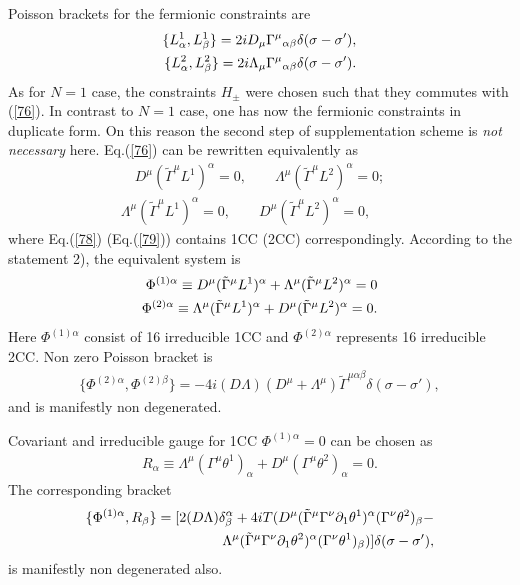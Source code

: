\documentclass[a4paper]{article}
\begin{document}
Poisson brackets for the fermionic constraints are 
\begin{eqnarray}\label{77}
\{L^1_\alpha, L^1_\beta\}=2iD_\mu{\Gamma^\mu}_{\alpha\beta}
\delta(\sigma-\sigma '), \cr 
\{L^2_\alpha,L^2_\beta\}=2i\Lambda_\mu{\Gamma^\mu}_{\alpha\beta}
\delta(\sigma-\sigma ').
\end{eqnarray}
As for $N=1$ case, the constraints $H_{\pm}$ were chosen such 
that they commutes with (\ref{76}). In contrast to $N=1$ case, one 
has now the fermionic constraints in duplicate form. On this reason 
the second step of supplementation scheme is {\em{not necessary}} 
here. Eq.(\ref{76}) can be rewritten equivalently as 
\begin{eqnarray}\label{78}
D^\mu(\tilde\Gamma^\mu L^1)^\alpha=0, \qquad 
\Lambda^\mu(\tilde\Gamma^\mu L^2)^\alpha=0;
\end{eqnarray}
\begin{eqnarray}\label{79}
\Lambda^\mu(\tilde\Gamma^\mu L^1)^\alpha=0, \qquad
D^\mu(\tilde\Gamma^\mu L^2)^\alpha=0, \qquad
\end{eqnarray}
where Eq.(\ref{78}) (Eq.(\ref{79})) contains 1CC (2CC) correspondingly. 
According to the statement 2), the equivalent system is 
\begin{eqnarray}\label{80}
\Phi^{(1)\alpha}\equiv
D^\mu(\tilde\Gamma^\mu L^1)^\alpha+
\Lambda^\mu(\tilde\Gamma^\mu L^2)^\alpha=0 \cr 
\Phi^{(2)\alpha}\equiv
\Lambda^\mu(\tilde\Gamma^\mu L^1)^\alpha+
D^\mu(\tilde\Gamma^\mu L^2)^\alpha=0.
\end{eqnarray}
Here $\Phi^{(1)\alpha}$ consist of 16 irreducible 1CC and 
$\Phi^{(2)\alpha}$ represents 16 irreducible 2CC. Non zero Poisson 
bracket is 
\begin{eqnarray}\label{81}
\{\Phi^{(2)\alpha}, \Phi^{(2)\beta}\}=-4i(D\Lambda)
(D^\mu+\Lambda^\mu)\tilde\Gamma^{\mu\alpha\beta}
\delta(\sigma-\sigma '),
\end{eqnarray}
and is manifestly non degenerated. 

Covariant and irreducible gauge for 1CC $\Phi^{(1)\alpha}=0$ 
can be chosen as 
\begin{eqnarray}\label{82}
R_\alpha\equiv\Lambda^\mu(\Gamma^\mu\theta^1)_\alpha+
D^\mu(\Gamma^\mu\theta^2)_\alpha=0.
\end{eqnarray}
The corresponding bracket 
\begin{eqnarray}\label{83} 
\{\Phi^{(1)\alpha}, R_\beta\}=[2(D\Lambda)\delta^\alpha_\beta+ 
4iT(D^\mu(\tilde\Gamma^\mu\Gamma^\nu\partial_1\theta^1)^\alpha
(\Gamma^\nu\theta^2)_\beta- \cr
\Lambda^\mu(\tilde\Gamma^\mu\Gamma^\nu\partial_1\theta^2)^\alpha
(\Gamma^\nu\theta^1)_\beta)]\delta(\sigma-\sigma '),
\end{eqnarray}
is manifestly non degenerated also.
\end{document}
